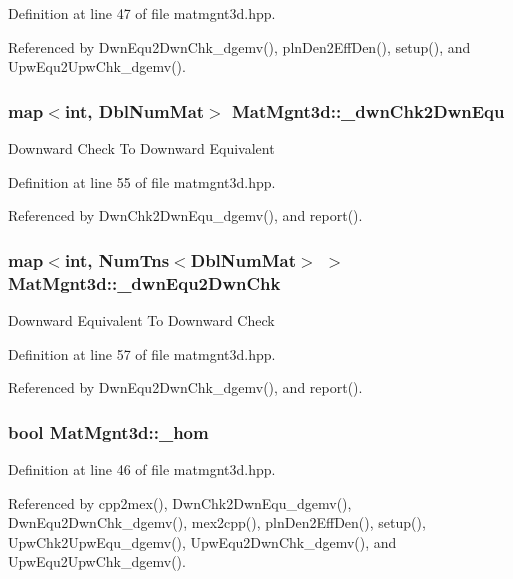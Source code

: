 Definition at line 47 of file matmgnt3d.hpp.

Referenced by Dwn\-Equ2Dwn\-Chk\_\-dgemv(), pln\-Den2Eff\-Den(), setup(), and Upw\-Equ2Upw\-Chk\_\-dgemv().
\subsubsection{\setlength{\rightskip}{0pt plus 5cm}map$<$int, Dbl\-Num\-Mat$>$ {\bf Mat\-Mgnt3d::\_\-dwn\-Chk2Dwn\-Equ}}\label{classMatMgnt3d_b9f0f9702035e0fc0ef0790827f5d059_b9f0f9702035e0fc0ef0790827f5d059}


Downward Check To Downward Equivalent 

Definition at line 55 of file matmgnt3d.hpp.

Referenced by Dwn\-Chk2Dwn\-Equ\_\-dgemv(), and report().
\subsubsection{\setlength{\rightskip}{0pt plus 5cm}map$<$int, Num\-Tns$<$Dbl\-Num\-Mat$>$ $>$ {\bf Mat\-Mgnt3d::\_\-dwn\-Equ2Dwn\-Chk}}\label{classMatMgnt3d_9dda4a0f7503a36d6e846d77ca1289d7_9dda4a0f7503a36d6e846d77ca1289d7}


Downward Equivalent To Downward Check 

Definition at line 57 of file matmgnt3d.hpp.

Referenced by Dwn\-Equ2Dwn\-Chk\_\-dgemv(), and report().
\subsubsection{\setlength{\rightskip}{0pt plus 5cm}bool {\bf Mat\-Mgnt3d::\_\-hom}}\label{classMatMgnt3d_d7665fc205b24f10a29dc5fb47e4c9f6_d7665fc205b24f10a29dc5fb47e4c9f6}




Definition at line 46 of file matmgnt3d.hpp.

Referenced by cpp2mex(), Dwn\-Chk2Dwn\-Equ\_\-dgemv(), Dwn\-Equ2Dwn\-Chk\_\-dgemv(), mex2cpp(), pln\-Den2Eff\-Den(), setup(), Upw\-Chk2Upw\-Equ\_\-dgemv(), Upw\-Equ2Dwn\-Chk\_\-dgemv(), and Upw\-Equ2Upw\-Chk\_\-dgemv().
